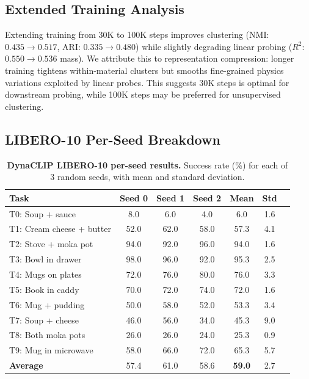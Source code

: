 \documentclass{article}
\begin{document}
\subsection{Extended Training Analysis}
\label{app:extended}

Extending training from 30K to 100K steps improves clustering (NMI: $0.435 \to 0.517$, ARI: $0.335 \to 0.480$) while slightly degrading linear probing ($R^2$: $0.550 \to 0.536$ mass). We attribute this to representation compression: longer training tightens within-material clusters but smooths fine-grained physics variations exploited by linear probes. This suggests 30K steps is optimal for downstream probing, while 100K steps may be preferred for unsupervised clustering.


\subsection{LIBERO-10 Per-Seed Breakdown}
\label{app:libero_seeds}

\begin{table}[h]
\centering
\caption{\textbf{DynaCLIP LIBERO-10 per-seed results.} Success rate (\%) for each of 3 random seeds, with mean and standard deviation.}
\label{tab:libero_seeds}
\small
\begin{tabular}{@{}lcccccc@{}}
\toprule
\textbf{Task} & \textbf{Seed 0} & \textbf{Seed 1} & \textbf{Seed 2} & \textbf{Mean} & \textbf{Std} \\
\midrule
T0: Soup + sauce & 8.0 & 6.0 & 4.0 & 6.0 & 1.6 \\
T1: Cream cheese + butter & 52.0 & 62.0 & 58.0 & 57.3 & 4.1 \\
T2: Stove + moka pot & 94.0 & 92.0 & 96.0 & 94.0 & 1.6 \\
T3: Bowl in drawer & 98.0 & 96.0 & 92.0 & 95.3 & 2.5 \\
T4: Mugs on plates & 72.0 & 76.0 & 80.0 & 76.0 & 3.3 \\
T5: Book in caddy & 70.0 & 72.0 & 74.0 & 72.0 & 1.6 \\
T6: Mug + pudding & 50.0 & 58.0 & 52.0 & 53.3 & 3.4 \\
T7: Soup + cheese & 46.0 & 56.0 & 34.0 & 45.3 & 9.0 \\
T8: Both moka pots & 26.0 & 26.0 & 24.0 & 25.3 & 0.9 \\
T9: Mug in microwave & 58.0 & 66.0 & 72.0 & 65.3 & 5.7 \\
\midrule
\textbf{Average} & 57.4 & 61.0 & 58.6 & \textbf{59.0} & 2.7 \\
\bottomrule
\end{tabular}
\end{table}
\end{document}

